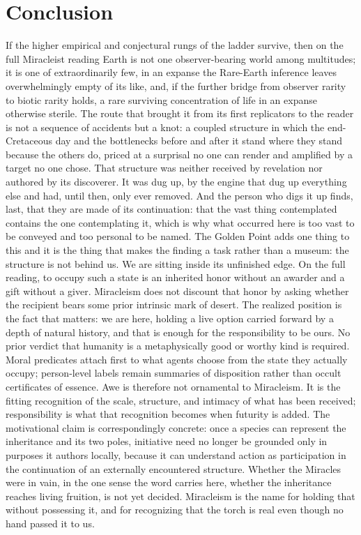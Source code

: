 \section{Conclusion}

If the higher empirical and conjectural rungs of the ladder survive,
then on the full Miracleist reading Earth is not one observer-bearing
world among multitudes; it is one of extraordinarily few, in an expanse the
Rare-Earth inference leaves overwhelmingly empty of its like, and, if
the further bridge from observer rarity to biotic rarity holds, a rare
surviving concentration of life in an expanse otherwise sterile. The
route that brought it
from its first replicators to the reader is not a sequence of accidents
but a knot: a coupled structure in which the end-Cretaceous day and the
bottlenecks before and after it stand where they stand because the
others do, priced at a surprisal no one can render and amplified by a
target no one chose. That structure was neither received by revelation
nor authored by its discoverer. It was dug up, by the engine that dug up
everything else and
had, until then, only ever removed. And the person who digs it up
finds, last, that they are made of its continuation: that the vast
thing contemplated contains the one contemplating it, which is why what
occurred here is too vast to be conveyed and too personal to be named.
The Golden Point adds one thing to this and it is the thing that makes
the finding a task rather than a museum: the structure is not behind
us. We are sitting inside its unfinished edge. On the full reading, to
occupy such a state is an inherited honor without an awarder and a gift
without a giver. Miracleism does not discount that honor by asking
whether the recipient bears some prior intrinsic mark of desert. The
realized position is the fact that matters: we are here, holding a live
option carried forward by a depth of natural history, and that is enough
for the responsibility to be ours. No prior verdict that humanity is a
metaphysically good or worthy kind is required. Moral predicates attach
first to what agents choose from the state they actually occupy;
person-level labels remain summaries of disposition rather than occult
certificates of essence. Awe is therefore not ornamental to Miracleism. It is the fitting
recognition of the scale, structure, and intimacy of what has been
received; responsibility is what that recognition becomes when futurity
is added. The motivational claim is correspondingly concrete: once a
species can represent the inheritance and its two poles, initiative need
no longer be grounded only in purposes it authors locally, because it
can understand action as participation in the continuation of an
externally encountered structure. Whether the Miracles were in vain, in
the one sense the word carries here, whether the inheritance reaches
living fruition, is not yet decided. Miracleism is the name for holding
that without possessing it, and for recognizing that the torch is real
even though no hand passed it to us.


